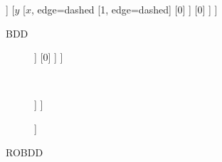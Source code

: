 \documentclass{article}
\begin{document}
\begin{figure}
	\centering

	\begin{forest}
		[$x$
		[$x$, edge=dashed
		[1, edge=dashed]
		[0]
		]
		[$y$
		[$x$, edge=dashed
		[1, edge=dashed]
		[0]
		]
		[0]
		]
		]
	\end{forest}

	\caption{BDD}
\end{figure}

\begin{figure}
	\centering

	\begin{subfigure}{0.5\textwidth}
		\centering

		\begin{forest}
			[$x$
			[1, edge=dashed]
			[$y$
			[$x$, edge=dashed
			[1, edge=dashed]
			[0]
			]
			[0]
			]
			]
		\end{forest}
	\end{subfigure}%
	~
	\begin{subfigure}{0.5\textwidth}
		\centering

		\begin{forest}
			[$x$
				[1, edge=dashed]
					[$y$
						[0, edge=dashed]
							[0]
					]
			]
		\end{forest}
	\end{subfigure}

	\begin{subfigure}{0.5\textwidth}
		\centering

		\begin{forest}
			[$x$
				[1, edge=dashed]
					[0]
			]
		\end{forest}
	\end{subfigure}

	\caption{ROBDD}
\end{figure}
\end{document}
